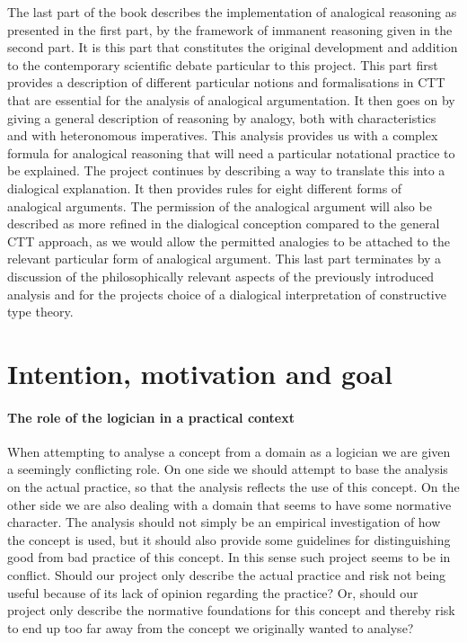         	The last part of the book describes the implementation of analogical reasoning as presented in the first part, by the framework of immanent reasoning given in the second part. It is this part that constitutes the original development and addition to the contemporary scientific debate particular to this project. This part first provides a description of different particular notions and formalisations in CTT that are essential for the analysis of analogical argumentation. It then goes on by giving a general description of reasoning by analogy, both with characteristics and with heteronomous imperatives. This analysis provides us with a complex formula for analogical reasoning that will need a particular notational practice to be explained. The project continues by describing a way to translate this into a dialogical explanation. It then provides rules for eight different forms of analogical arguments. The permission of the analogical argument will also be described as more refined in the dialogical conception compared to the general CTT approach, as we would allow the permitted analogies to be attached to the relevant particular form of analogical argument. This last part terminates by a discussion of the philosophically relevant aspects of the previously introduced analysis and for the projects choice of a dialogical interpretation of constructive type theory.

	\section{Intention, motivation and goal}

		\paragraph{The role of the logician in a practical context}
		
			When attempting to analyse a concept from a domain as a logician we are given a seemingly conflicting role. On one side we should attempt to base the analysis on the actual practice, so that the analysis reflects the use of this concept. On the other side we are also dealing with a domain that seems to have some normative character. The analysis should not simply be an empirical investigation of how the concept is used, but it should also provide some guidelines for distinguishing good from bad practice of this concept. In this sense such project seems to be in conflict. Should our project only describe the actual practice and risk not being useful because of its lack of opinion regarding the practice? Or, should our project only describe the normative foundations for this concept and thereby risk to end up too far away from the concept we originally wanted to analyse? 
			

